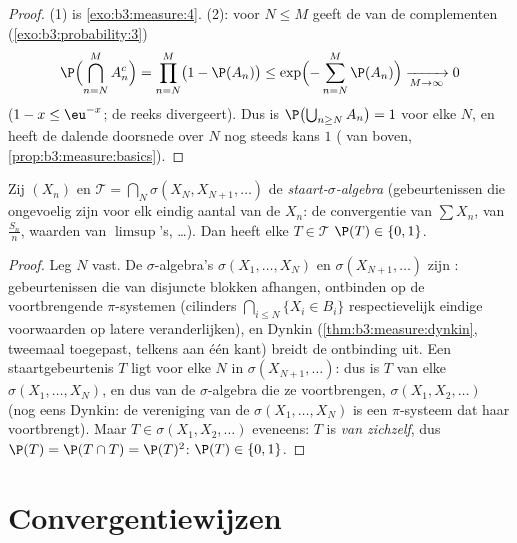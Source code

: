\begin{proof}
(1) is \cref{exo:b3:measure:4}. (2): voor $N \leq M$ geeft de
 van de complementen
(\cref{exo:b3:probability:3})
\[
\P\Bigl(\bigcap_{n=N}^{M}A_n^c\Bigr) = \prod_{n=N}^M\bigl(1
- \P(A_n)\bigr) \leq
\exp\Bigl(-\sum_{n=N}^M\P(A_n)\Bigr) \xrightarrow[M \to
\infty]{} 0
\]
($1 - x \leq \eu^{-x}$; de reeks divergeert). Dus is
$\P\bigl(\bigcup_{n\geq N}A_n\bigr) = 1$ voor elke $N$, en heeft
de dalende doorsnede over $N$ nog steeds kans $1$ (
van boven, \cref{prop:b3:measure:basics}).
\end{proof}

\begin{theorem}
\label{thm:b3:probability:zeroone}
Zij $(X_n)$  en $\mathcal T = \bigcap_N\sigma(X_N,
X_{N+1}, \dots)$ de \emph{staart-$\sigma$-algebra} (gebeurtenissen die ongevoelig zijn voor elk
eindig aantal van de $X_n$: de convergentie van $\sum X_n$, van
$\frac{S_n}n$, waarden van $\limsup$'s, \dots). Dan heeft elke $T
\in \mathcal T$ $\P(T) \in \{0, 1\}$.
\end{theorem}

\begin{proof}
Leg $N$ vast. De $\sigma$-algebra's $\sigma(X_1, \dots, X_N)$ en
$\sigma(X_{N+1}, \dots)$ zijn : gebeurtenissen die
van disjuncte blokken afhangen, ontbinden op de voortbrengende
$\pi$-systemen (cilinders $\bigcap_{i\leq N}\{X_i \in B_i\}$
respectievelijk eindige voorwaarden op latere veranderlijken), en
Dynkin (\cref{thm:b3:measure:dynkin}, tweemaal toegepast, telkens
aan één kant) breidt de ontbinding uit. Een staartgebeurtenis $T$
ligt voor elke $N$ in $\sigma(X_{N+1}, \dots)$: dus is $T$
 van elke $\sigma(X_1, \dots, X_N)$, en dus van de
$\sigma$-algebra die ze voortbrengen, $\sigma(X_1, X_2, \dots)$
(nog eens Dynkin: de vereniging van de $\sigma(X_1,\dots,X_N)$ is
een $\pi$-systeem dat haar voortbrengt). Maar $T \in \sigma(X_1,
X_2, \dots)$ eveneens: $T$ is  \emph{van zichzelf},
dus $\P(T) = \P(T\cap T) = \P(T)^2$: $\P(T) \in \{0, 1\}$.
\end{proof}

\section{Convergentiewijzen}

